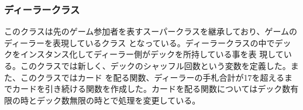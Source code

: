 \subsubsection{ディーラークラス}
このクラスは先のゲーム参加者を表すスーパークラスを継承しており、ゲームのディーラーを表現しているクラス
となっている。ディーラークラスの中でデックをインスタンス化してディーラー側がデックを所持している事を表
現している。このクラスでは新しく、デックのシャッフル回数という変数を定義した。また、このクラスではカード
を配る関数、ディーラーの手札合計が17を超えるまでカードを引き続ける関数を作成した。カードを配る関数についてはデック数有限の時とデック数無限の時とで処理を変更している。%

